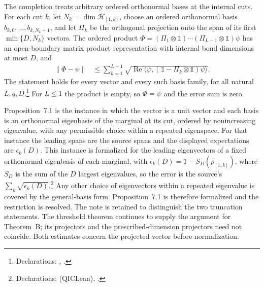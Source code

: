 \documentclass{article}
\begin{document}
The completion treats arbitrary ordered orthonormal bases at the internal
cuts. For each cut $k$, let $N_k=\dim\mathcal H_{[1,k]}$, choose an ordered
orthonormal basis $b_{k,0},\ldots,b_{k,N_k-1}$, and let $\Pi_k$ be the
orthogonal projection onto the span of its first $\min\{D,N_k\}$ vectors.
The ordered product
$\Phi=(\Pi_1\otimes\mathbb 1)\cdots(\Pi_{L-1}\otimes\mathbb 1)\psi$
has an open-boundary matrix product representation with internal bond
dimensions at most $D$, and
\begin{align}
    \|\Phi-\psi\|
     & \le\sum_{k=1}^{L-1}
    \sqrt{\operatorname{Re}\langle\psi,(\mathbb 1-\Pi_k\otimes\mathbb 1)\psi\rangle}.
    \label{eq:tnlean_one_dimensional_threshold_truncation_ordered_span_error}
\end{align}
The statement holds for every vector and every such basis family, for all
natural $L,q,D$.\footnote{Declarations:
    ,
    .}
For $L\le1$ the product is empty, so $\Phi=\psi$ and the error sum is zero.

Proposition~7.1 is the instance in which the vector is a unit vector and each
basis is an orthonormal eigenbasis of the marginal at its cut, ordered by
nonincreasing eigenvalue, with any permissible choice within a repeated
eigenspace. For that instance the leading spans are the source spans and the
displayed expectations are $\epsilon_k(D)$. This instance is formalized
for the leading eigenvectors of a fixed orthonormal eigenbasis of each
marginal, with $\epsilon_k(D)=1-S_D(\rho_{[1,k]})$, where $S_D$ is the sum of
the $D$ largest eigenvalues, so the error is the source's
$\sum_k\sqrt{\epsilon_k(D)}$.\footnote{Declarations:
     (QICLean),
    .}
Any other choice of eigenvectors within a repeated eigenvalue is covered by
the general-basis form. Proposition~7.1 is therefore formalized and the
restriction is resolved.
The note is retained to distinguish the two truncation statements. The
threshold theorem continues to supply the argument for Theorem~B; its
projectors and the prescribed-dimension projectors need not coincide.
Both estimates concern the projected vector before normalization.



\end{document}
